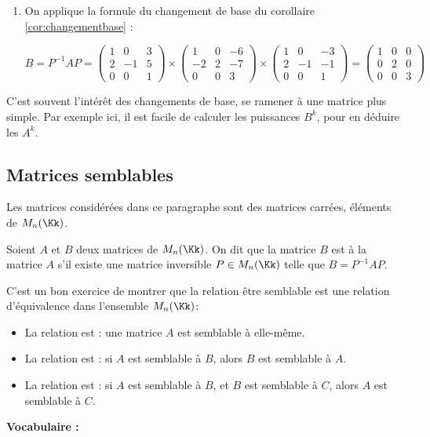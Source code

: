 \documentclass[class=report,crop=false]{standalone}
\begin{document}
\begin{exemple}
\begin{enumerate}
  \item On applique la formule du changement de base du corollaire \ref{cor:changementbase} :

  $$B = P^{-1} A P =
\begin{pmatrix}
1 & 0 & 3\\
2 & -1 & 5\\
0 & 0 & 1
\end{pmatrix} \times
\begin{pmatrix}
1 & 0 & -6\\
-2 & 2 & -7\\
0 & 0 & 3
\end{pmatrix}
\times
\begin{pmatrix}
1 & 0 & -3\\
2 & -1 & -1\\
0 & 0 & 1
\end{pmatrix}
=
\begin{pmatrix}
1 & 0 & 0\\
0 & 2 & 0\\
0 & 0 & 3
\end{pmatrix}$$
\end{enumerate}
C'est souvent l'intérêt des changements de base, se ramener à une matrice plus simple.
Par exemple ici, il est facile de calculer les puissances $B^k$, pour en déduire les $A^k$.


\end{exemple}



\subsection{Matrices semblables}


Les matrices considérées dans ce paragraphe sont des matrices carrées,
éléments de $M_n(\Kk)$.
\begin{definition}
Soient $A$ et $B$ deux matrices de $M_n(\Kk)$.
On dit que la matrice $B$ est  à la matrice $A$ s'il existe une
matrice inversible $P \in M_n(\Kk)$ telle que
$B=P^{-1}AP$.
\end{definition}

C'est un bon exercice de montrer que la relation \og être semblable \fg{} est une relation
d'équivalence dans l'ensemble $M_n(\Kk)$:
\begin{proposition}
\sauteligne
\begin{itemize}
  \item La relation est  : une matrice $A$ est semblable à elle-même.

  \item La relation est  : si $A$ est semblable à $B$,
  alors $B$ est semblable à $A$.

  \item La relation est  : si $A$ est semblable à $B$,
  et $B$ est semblable à $C$, alors $A$ est semblable à $C$.
\end{itemize}
\end{proposition}
{\bf Vocabulaire :}
\end{document}
